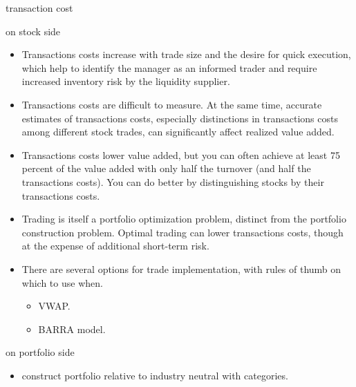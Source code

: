 \documentclass[presentation]{beamer}
\begin{document}
\begin{frame}[label={sec:orgheadline10}]{transaction cost}
\begin{block}{on stock side}
\begin{itemize}
\item Transactions costs increase with trade size and the desire for quick execution, which help to identify the manager as an informed trader and require increased inventory risk by the liquidity supplier.
\item Transactions costs are difficult to measure. At the same time, accurate estimates of transactions costs, especially distinctions in transactions costs among different stock trades, can significantly affect realized value added.
\item Transactions costs lower value added, but you can often achieve at least 75 percent of the value added with only half the turnover (and half the transactions costs). You can do better by distinguishing stocks by their transactions costs.
\item Trading is itself a portfolio optimization problem, distinct from the portfolio construction problem. Optimal trading can lower transactions costs, though at the expense of additional short-term risk.
\item There are several options for trade implementation, with rules of thumb on which to use when.
\begin{itemize}
\item VWAP.
\item BARRA model.
\end{itemize}
\end{itemize}
\end{block}

\begin{block}{on portfolio side}
\begin{itemize}
\item construct portfolio relative to industry neutral with categories.
\end{itemize}
\end{block}
\end{frame}
\end{document}
